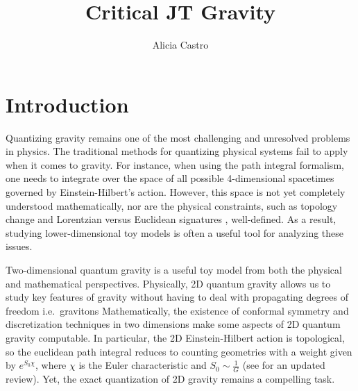 \documentclass[a4paper,11pt]{article}
\title{\boldmath Critical JT Gravity}
\author{Alicia Castro}
\affiliation{IMAPP, Radboud University,\\
6525 AJ Nijmegen, Netherlands}
\begin{document}
\maketitle
\flushbottom

\section{Introduction}

Quantizing gravity remains one of the most challenging and unresolved problems in physics. The traditional methods for quantizing physical systems fail to apply when it comes to gravity. For instance, when using the path integral formalism, one needs to integrate over the space of all possible 4-dimensional spacetimes governed by Einstein-Hilbert's action. However, this space is not yet completely understood mathematically, nor are the physical constraints, such as topology change and Lorentzian versus Euclidean signatures \cite{Ambjorn:1998fd}, well-defined.  As a result, studying lower-dimensional toy models is often a useful tool for analyzing these issues.

Two-dimensional quantum gravity is a useful toy model from both the physical and mathematical perspectives. Physically, 2D quantum gravity allows us to study key features of gravity without having to deal with propagating degrees of freedom i.e.\ gravitons  Mathematically, the existence of conformal symmetry and discretization techniques in two dimensions make some aspects of 2D quantum gravity computable. In particular, the 2D Einstein-Hilbert action is topological, so the euclidean path integral reduces to counting geometries with a weight given by $e^{S_0\chi}$, where $\chi$ is the Euler characteristic and $S_0\sim\frac{1}{G}$ (see \cite{Budd:2022zry} for an updated review). Yet, the exact quantization of 2D gravity remains a compelling task.
\end{document}

